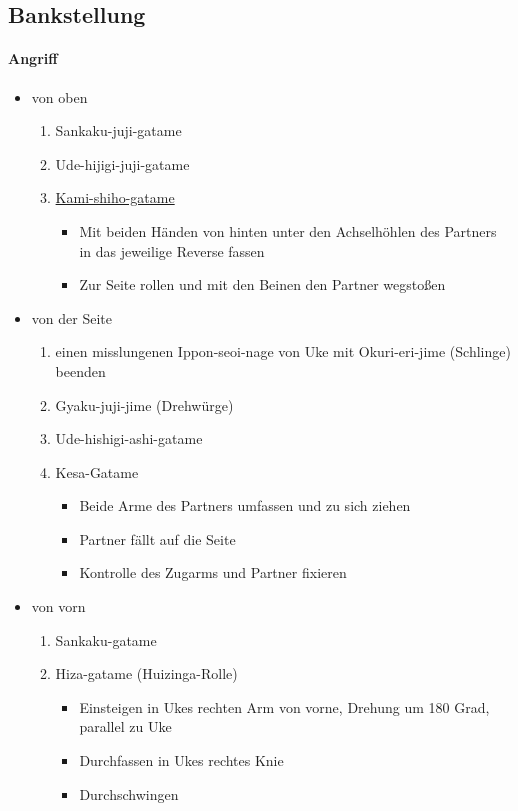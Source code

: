 \documentclass[justified, a4paper, notitlepage, captions=tableheading, nobib]{tufte-handout}
\begin{document}
\subsection{\label{orgf95c5ab}Bankstellung }
\label{sec:org2baf978}
\paragraph{Angriff}
\label{sec:org4d4603b}
\begin{itemize}
\item von oben
\begin{enumerate}
\item Sankaku-juji-gatame
\item Ude-hijigi-juji-gatame
\item \hyperref[orgc5066bb]{Kami-shiho-gatame}
\begin{itemize}
\item Mit beiden Händen von hinten unter den Achselhöhlen des Partners in das jeweilige Reverse fassen
\item Zur Seite rollen und mit den Beinen den Partner wegstoßen
\end{itemize}
\end{enumerate}
\item von der Seite
\begin{enumerate}
\item einen misslungenen Ippon-seoi-nage von Uke mit Okuri-eri-jime (Schlinge) beenden
\item Gyaku-juji-jime (Drehwürge)
\item Ude-hishigi-ashi-gatame
\item Kesa-Gatame
\begin{itemize}
\item Beide Arme des Partners umfassen und zu sich ziehen
\item Partner fällt auf die Seite
\item Kontrolle des Zugarms und Partner fixieren
\end{itemize}
\end{enumerate}
\item von vorn
\begin{enumerate}
\item Sankaku-gatame
\item Hiza-gatame (Huizinga-Rolle)
\begin{itemize}
\item Einsteigen in Ukes rechten Arm von vorne, Drehung um 180 Grad, parallel zu Uke
\item Durchfassen in Ukes rechtes Knie
\item Durchschwingen
\end{itemize}
\end{enumerate}
\end{itemize}
\end{document}
